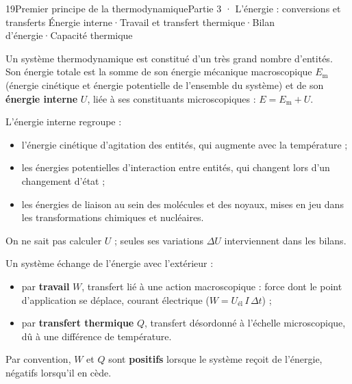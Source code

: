 \begin{ouverture}[thermo]{19}{Premier principe de la thermodynamique}{Partie 3 · L'énergie : conversions et transferts}
{Énergie interne\enspace·\enspace Travail et transfert thermique\enspace·\enspace Bilan d'énergie\enspace·\enspace Capacité thermique}
\end{ouverture}
\essentiel
{}
\begin{definition}
Un système thermodynamique est constitué d'un très grand nombre d'entités. Son énergie totale est la somme de son
énergie mécanique macroscopique $E_\mathrm{m}$ (énergie cinétique et énergie potentielle de l'ensemble du système) et de son
\textbf{énergie interne} $U$, liée à ses constituants microscopiques : $E=E_\mathrm{m}+U$.
\end{definition}
\begin{propriete}
L'énergie interne regroupe :
\begin{itemize}
\item l'énergie cinétique d'agitation des entités, qui augmente avec la température ;
\item les énergies potentielles d'interaction entre entités, qui changent lors d'un changement d'état ;
\item les énergies de liaison au sein des molécules et des noyaux, mises en jeu dans les transformations chimiques et
nucléaires.
\end{itemize}
On ne sait pas calculer $U$ ; seules ses variations $\Delta U$ interviennent dans les bilans.
\end{propriete}
\begin{definition}
Un système échange de l'énergie avec l'extérieur :
\begin{itemize}
\item par \textbf{travail} $W$, transfert lié à une action macroscopique : force dont le point d'application se déplace,
courant électrique ($W=U_\mathrm{él}\,I\,\Delta t$) ;
\item par \textbf{transfert thermique} $Q$, transfert désordonné à l'échelle microscopique, dû à une différence de
température.
\end{itemize}
Par convention, $W$ et $Q$ sont \textbf{positifs} lorsque le système reçoit de l'énergie, négatifs lorsqu'il en cède.
\end{definition}
